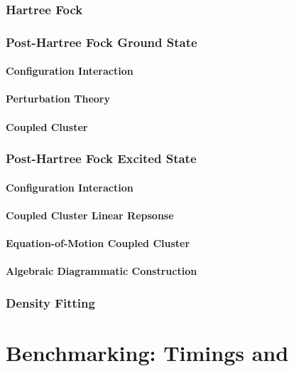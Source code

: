 \documentclass{article}
\begin{document}
\section{Hartree Fock}

\section{Post-Hartree Fock Ground State}

\subsection{Configuration Interaction}

\subsection{Perturbation Theory}

\subsection{Coupled Cluster}

\section{Post-Hartree Fock Excited State}

\subsection{Configuration Interaction}

\subsection{Coupled Cluster Linear Repsonse}

\subsection{Equation-of-Motion Coupled Cluster}

\subsection{Algebraic Diagrammatic Construction}

\section{Density Fitting}



\part{Benchmarking: Timings and }
\end{document}
